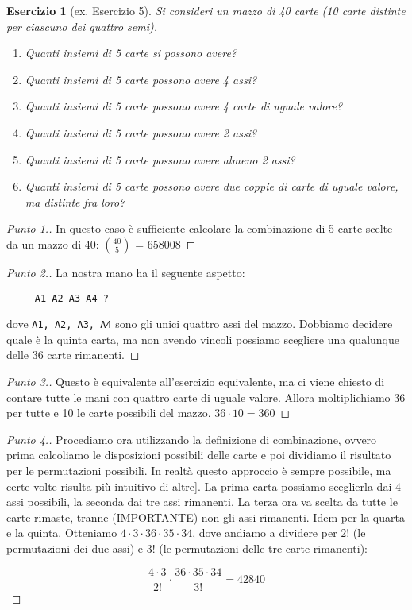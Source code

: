 \documentclass[12pt]{article}
\newtheorem{theorem}{Esercizio}
\renewcommand\qedsymbol{$\square$}
\begin{document}
\renewcommand\qedsymbol{$\square$}

\begin{theorem}[ex. Esercizio 5]
\label{ex:carte:almeno}
Si consideri un mazzo di 40 carte (10 carte distinte per ciascuno dei quattro semi).

\begin{enumerate}
    \item Quanti insiemi di 5 carte si possono avere?
    \item Quanti insiemi di 5 carte possono avere 4 assi?
    \item Quanti insiemi di 5 carte possono avere 4 carte di uguale valore?
    \item Quanti insiemi di 5 carte possono avere 2 assi?
    \item Quanti insiemi di 5 carte possono avere almeno 2 assi?
    \item Quanti insiemi di 5 carte possono avere due coppie di carte di uguale valore, ma distinte fra loro?
\end{enumerate}
\end{theorem}

\begin{proof}[Punto 1.]
In questo caso è sufficiente calcolare la combinazione di 5 carte scelte da un mazzo di 40: ${40 \choose 5}$ = 658008
\end{proof}

\begin{proof}[Punto 2.]
La nostra mano ha il seguente aspetto:

\begin{verbatim}
     A1 A2 A3 A4 ?
\end{verbatim}

dove \verb=A1, A2, A3, A4= sono gli unici quattro assi del mazzo. Dobbiamo decidere quale è la quinta carta, ma non avendo vincoli possiamo scegliere una qualunque delle 36 carte rimanenti. 
\end{proof}

\begin{proof}[Punto 3.]
Questo è equivalente all'esercizio equivalente, ma ci viene chiesto di contare tutte le mani con quattro carte di uguale valore. Allora moltiplichiamo 36 per tutte e 10 le carte possibili del mazzo. $36 \cdot 10 = 360$
\end{proof}

\begin{proof}[Punto 4.]
Procediamo ora utilizzando la definizione di combinazione, ovvero prima calcoliamo le disposizioni possibili delle carte e poi dividiamo il risultato per le permutazioni possibili. In realtà questo approccio è sempre possibile, ma certe volte risulta più intuitivo di altre]. La prima carta possiamo sceglierla dai 4 assi possibili, la seconda dai tre assi rimanenti. La terza ora va scelta da tutte le carte rimaste, tranne (IMPORTANTE) non gli assi rimanenti. Idem per la quarta e la quinta. 
Otteniamo $4 \cdot 3 \cdot 36 \cdot 35 \cdot 34$, dove andiamo a dividere per $2!$ (le permutazioni dei due assi) e $3!$ (le permutazioni delle tre carte rimanenti):

$$
\frac{4\cdot3}{2!}\cdot\frac{36\cdot35\cdot34}{3!} = 42840
$$
\end{proof}
\end{document}
